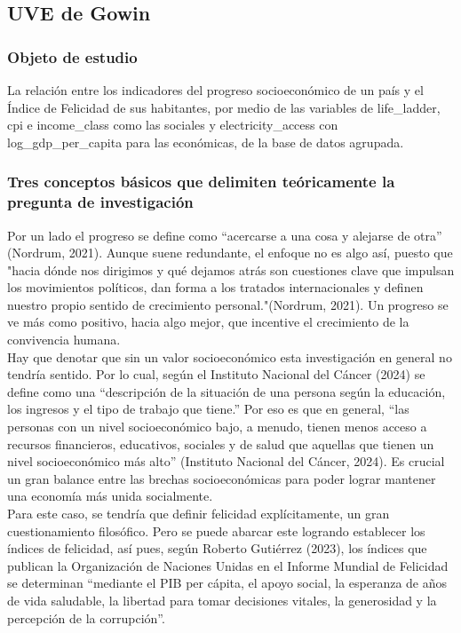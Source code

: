 \newpage

\subsection{UVE de Gowin}

\subsubsection{Objeto de estudio}

La relación entre los indicadores del progreso socioeconómico de un país y el Índice de Felicidad de sus habitantes, por medio de las variables de life\_ladder, cpi e income\_class como las sociales y electricity\_access con log\_gdp\_per\_capita para las económicas, de la base de datos agrupada.  \\

\subsubsection{Tres conceptos básicos que delimiten teóricamente la pregunta de investigación}

Por un lado el progreso se define como ``acercarse a una cosa y alejarse de otra'' (Nordrum, 2021). Aunque suene redundante, el enfoque no es algo así, puesto que "hacia dónde nos dirigimos y qué dejamos atrás son cuestiones clave que impulsan los movimientos políticos, dan forma a los tratados internacionales y definen nuestro propio sentido de crecimiento personal."(Nordrum, 2021). Un progreso se ve más como positivo, hacia algo mejor, que incentive el crecimiento de la convivencia humana. \\

Hay que denotar que sin un valor socioeconómico esta investigación en general no tendría sentido. Por lo cual, según 
el Instituto Nacional del Cáncer (2024) se define como una ``descripción de la situación de una persona según la educación, los ingresos y el tipo de trabajo que tiene.'' Por eso es que en general, ``las personas con un nivel socioeconómico bajo, a menudo, tienen menos acceso a recursos financieros, educativos, sociales y de salud que aquellas que tienen un nivel socioeconómico más alto'' (Instituto Nacional del Cáncer, 2024). Es crucial un gran balance entre las brechas socioeconómicas para poder lograr mantener una economía más unida socialmente. \\

Para este caso, se tendría que definir felicidad explícitamente, un gran cuestionamiento filosófico. Pero se puede abarcar este logrando establecer los índices de felicidad, así pues, según Roberto Gutiérrez (2023), los índices que publican la Organización de Naciones Unidas en el Informe Mundial de Felicidad se determinan ``mediante el PIB per cápita, el apoyo social, la esperanza de años de vida saludable, la libertad para tomar decisiones vitales, la generosidad y la percepción de la corrupción''.\\

